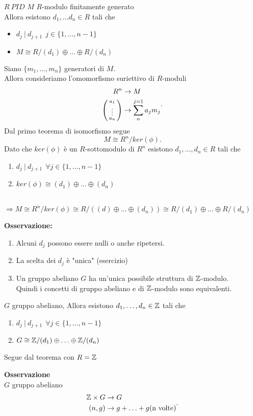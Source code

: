 \documentclass[12px]{article}
\begin{document}
\begin{teo}
	$R\ PID$  $M$ $R$-modulo finitamente generato \\
	Allora esistono $d_1,\ldots d_n\in R$ tali che
	\begin{itemize}
		\item $d_j\ | \ d_{j+1} \ \ j\in\{1,\ldots,n-1\}$
		\item $M\cong R/(d_1)\oplus \ldots\oplus R/(d_n)$
	\end{itemize}
\end{teo}
\begin{dimo}
	Siano $\{m_1,\ldots,m_n\}$ generatori di $M.$\\
	Allora consideriamo l'omomorfismo suriettivo di $R$-moduli
	 \[
	\begin{aligned}
		R^n &\rightarrow M\\
		\left(\begin{smallmatrix}a_1\\\vdots\\a_n\end{smallmatrix}\right) &\rightarrow \sum^{j=1}_{n}a_jm_j
	\end{aligned}
	.\] 
	Dal primo teorema di isomorfismo segue
	\[
	M\cong R^n/ker(\phi)
	.\] 
	Dato che $ker(\phi)$ è un $R$-sottomodulo di $R^n$ esistono  $d_1,\ldots,d_n\in R$ tali che
	\begin{enumerate}
		\item $d_j \ | \ d_{j+1} \ \ \forall j\in\{1,\ldots, n-1\}$
		\item  $ker(\phi)\cong (d_1)\oplus\ldots\oplus (d_n)$
	\end{enumerate}\\
	$ \Rightarrow M\cong R^n/ker(\phi)\cong R/((d)\oplus\ldots\oplus (d_n))\cong R/(d_1)\oplus\ldots\oplus R/(d_n)$
\end{dimo}
\textbf{Osservazione:}
\begin{enumerate}
	\item Alcuni $d_j$ possono essere nulli o anche ripetersi.
	\item La scelta dei $d_j$ è "unica" (esercizio)
	\item Un gruppo abeliano $G$ ha un'unica possibile struttura di $\mathbb{Z}$-modulo.\\
		Quindi i concetti di gruppo abeliano e di $\mathbb{Z}$-modulo sono equivalenti.
\end{enumerate}
\begin{coro}
	$G$ gruppo abeliano, Allora esistono $d_1,\ldots,d_n\in \mathbb{Z}$ tali che 
	\begin{enumerate}
		\item $d_j\ | \ d_{j+1} \ \ \forall j\in \{1,\ldots, n-1\}$
		\item $G\cong \mathbb{Z}/(d_1)\oplus\ldots\oplus \mathbb{Z}/(d_n)$
	\end{enumerate}
\end{coro}
\begin{dimo}
	Segue dal teorema con $R = \mathbb{Z}$
\end{dimo}
\textbf{Osservazione}\\
$G$ gruppo abeliano
\[
\begin{aligned}
	\mathbb{Z}\times G &\rightarrow G\\
	(n,g) &\rightarrow g+ \ldots + g (\text {n volte})
\end{aligned}
.\] 
\newpage
\end{document}
